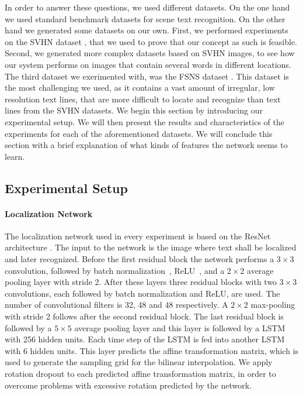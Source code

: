 \documentclass[letterpaper]{article}
\begin{document}
	In order to answer these questions, we used different datasets.
	On the one hand we used standard benchmark datasets for scene text recognition.
	On the other hand we generated some datasets on our own.
	First, we performed experiments on the SVHN dataset \cite{Netzer2011Reading}, that we used to prove that our concept as such is feasible.
	Second, we generated more complex datasets based on SVHN images, to see how our system performs on images that contain several words in different locations.
	The third dataset we exerimented with, was the \acf{FSNS} dataset \cite{Smith2016EndToEnd}.
	This dataset is the most challenging we used, as it contains a vast amount of irregular, low resolution text lines, that are more difficult to locate and recognize than text lines from the SVHN datasets.
	We begin this section by introducing our experimental setup.
	We will then present the results and characteristics of the experiments for each of the aforementioned datasets.
	We will conclude this section with a brief explanation of what kinds of features the network seems to learn.

	\subsection{Experimental Setup}
	\label{ssec:experimental_setup}

	\paragraph{Localization Network}
	The localization network used in every experiment is based on the ResNet architecture \cite{He2016Deep}.
	The input to the network is the image where text shall be localized and later recognized.
	Before the first residual block the network performs a $3 \times 3$ convolution, followed by batch normalization~\cite{Ioffe2015Batcha}, ReLU~\cite{Nair2010Rectified}, and a $2 \times 2$ average pooling layer with stride 2.
	After these layers three residual blocks with two $3 \times 3$ convolutions, each followed by batch normalization and ReLU, are used.
	The number of convolutional filters is 32, 48 and 48 respectively.
	A $2 \times 2$ max-pooling with stride 2 follows after the second residual block.
	The last residual block is followed by a $5 \times 5$ average pooling layer and this layer is followed by a \ac{LSTM} with 256 hidden units.
	Each time step of the \ac{LSTM} is fed into another \ac{LSTM} with 6 hidden units.
	This layer predicts the affine transformation matrix, which is used to generate the sampling grid for the bilinear interpolation.
	We apply rotation dropout to each predicted affine transformation matrix, in order to overcome problems with excessive rotation predicted by the network.
\end{document}
